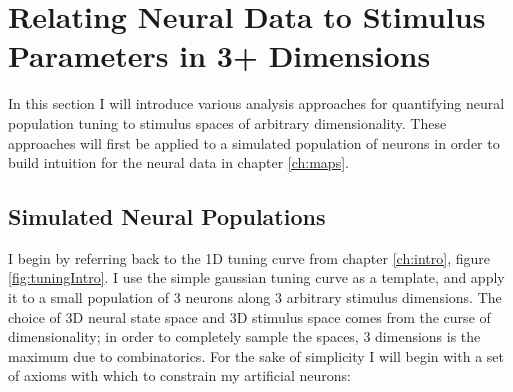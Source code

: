 
\chapter{\color{thesisBlue} Relating Neural Data to Stimulus Parameters in 3+ Dimensions} %

\label{ch:optim} %


\newcommand{\keyword}[1]{\textbf{#1}}


In this section I will introduce various analysis approaches for quantifying neural population tuning to stimulus spaces of arbitrary dimensionality. These approaches will first be applied to a simulated population of neurons in order to build intuition for the neural data in chapter \ref{ch:maps}.




\section{Simulated Neural Populations}
\label{sec:ccaSimulations}
I begin by referring back to the 1D tuning curve from chapter \ref{ch:intro}, figure \ref{fig:tuningIntro}. I use the simple gaussian tuning curve as a template, and apply it to a small population of 3 neurons along 3 arbitrary stimulus dimensions. The choice of 3D neural state space and 3D stimulus space comes from the curse of dimensionality; in order to completely sample the spaces, 3 dimensions is the maximum due to combinatorics. For the sake of simplicity I will begin with a set of axioms with which to constrain my artificial neurons:

